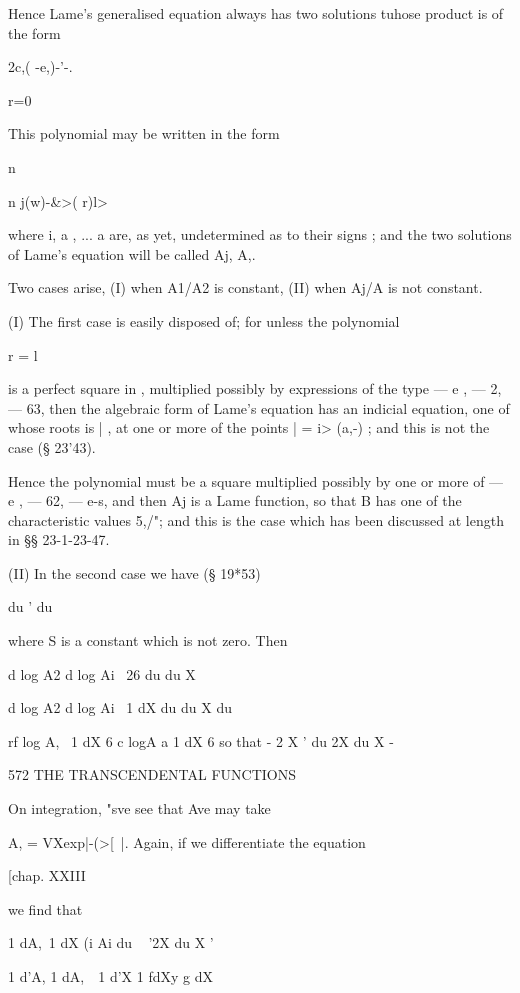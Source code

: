 {{{{{{{{Hence Lame's generalised equation always has two solutions tuhose
product is of the form

2c,( -e,)-'-.

r=0

This polynomial may be written in the form

n

n j(w)-\&>( r)l>

where i, a , ... a are, as yet, undetermined as to their signs ; and
the two solutions of Lame's equation will be called Aj, A,.

Two cases arise, (I) when A1/A2 is constant, (II) when Aj/A is not
constant.

(I) The first case is easily disposed of; for unless the polynomial

r = l

is a perfect square in , multiplied possibly by expressions of the
type — e , — 2, — 63, then the algebraic form of Lame's equation has
an indicial equation, one of whose roots is | , at one or more of the
points | = i> (a,-) ; and this is not the case (§ 23'43).

Hence the polynomial must be a square multiplied possibly by one or
more of — e , — 62, — e-s, and then Aj is a Lame function, so that B
has one of the characteristic values 5,/"; and this is the case which
has been discussed at length in §§ 23-1-23-47.

(II) In the second case we have (§ 19*53)

du ' du

where S is a constant which is not zero. Then

d log A2 d log Ai \ 26 du du X

d log A2 d log Ai \ 1 dX du du X du

rf log A, \ 1 dX 6 c logA a 1 dX 6 so that - 2 X ' du 2X du X -



572 THE TRANSCENDENTAL FUNCTIONS

On integration, "sve see that Ave may take

A, = VXexp|-(>[~|. Again, if we differentiate the equation



[chap. XXIII



we find that



1 dA,\ 1 dX (i Ai du ~ '2X du X '



1 d'A, 1 dA,\ \ 1 d'X 1 fdXy g dX



}}}}}}}}
